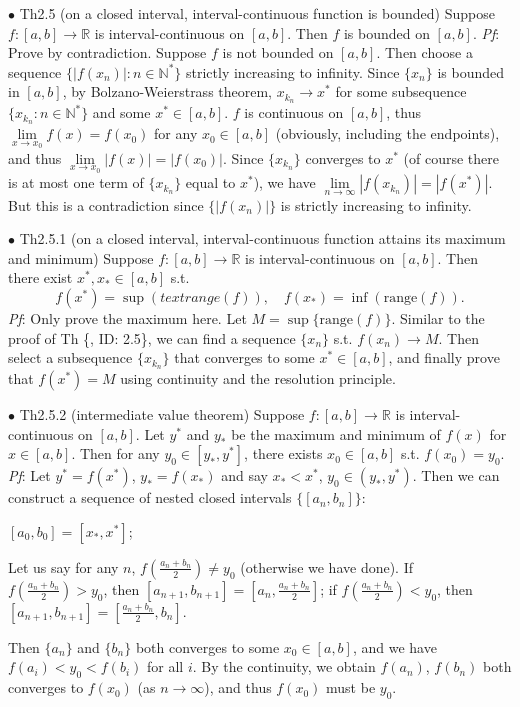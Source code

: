 \documentclass{article}
\begin{document}
\begin{Th}{$\bullet$ Th2.5 (on a closed interval, interval-continuous function is bounded)}
    Suppose $f:[a,b]\rightarrow\mathbb{R}$ is interval-continuous on $[a,b]$. Then $f$ is bounded on $[a,b]$.
    \tcblower
    \textit{Pf}: Prove by contradiction. Suppose $f$ is not bounded on $[a,b]$. Then choose a sequence $\{|f(x_n)|: n\in\mathbb{N}^*\}$ strictly increasing to infinity. Since $\{x_n\}$ is bounded in $[a,b]$, by Bolzano-Weierstrass theorem, $x_{k_n}\rightarrow x^*$ for some subsequence $\{x_{k_n}: n\in\mathbb{N}^*\}$ and some $x^*\in [a,b]$. $f$ is continuous on $[a,b]$, thus $\lim\limits_{x\to x_0}f(x) = f(x_0)$ for any $x_0\in[a,b]$ (obviously, including the endpoints), and thus $\lim\limits_{x\to x_0}|f(x)| = |f(x_0)|$. Since $\{x_{k_n}\}$ converges to $x^*$ (of course there is at most one term of $\{x_{k_n}\}$ equal to $x^*$), we have $\lim\limits_{n\to\infty}|f(x_{k_n})| = |f(x^*)|$. But this is a contradiction since $\{|f(x_n)|\}$ is strictly increasing to infinity.
\end{Th}

\begin{Th}{$\bullet$ Th2.5.1 (on a closed interval, interval-continuous function attains its maximum and minimum)}
    Suppose $f:[a,b]\rightarrow\mathbb{R}$ is interval-continuous on $[a,b]$. Then there exist $x^*, x_*\in [a,b]$ s.t. 
    $$f(x^*) = \sup(text{range}(f)), \quad f(x_*) = \inf(\text{range}(f)).$$
    \tcblower
    \textit{Pf}: Only prove the maximum here. Let $M = \sup\{\text{range}(f)\}$. Similar to the proof of Th \{, ID: 2.5\}, we can find a sequence $\{x_n\}$ s.t. $f(x_n)\rightarrow M$. Then select a subsequence $\{x_{k_n}\}$ that converges to some $x^*\in[a,b]$, and finally prove that $f(x^*) = M$ using continuity and the resolution principle.
\end{Th}

\begin{Th}{$\bullet$ Th2.5.2 (intermediate value theorem)}
    Suppose $f:[a,b]\rightarrow\mathbb{R}$ is interval-continuous on $[a,b]$. Let $y^*$ and $y_*$ be the maximum and minimum of $f(x)$ for $x\in [a,b]$. Then for any $y_0\in [y_*, y^*]$, there exists $x_0\in [a,b]$ s.t. $f(x_0) = y_0$.
    \tcblower
    \textit{Pf}: Let $y^* = f(x^*)$, $y_* = f(x_*)$ and say $x_*<x^*$, $y_0\in(y_*, y^*)$. Then we can construct a sequence of nested closed intervals $\{[a_n, b_n]\}$:
    \begin{compactitem}
        \item $[a_0, b_0] = [x_*, x^*]$;
        \item Let us say for any $n$, $f(\frac{a_n+b_n}{2})\neq y_0 $ (otherwise we have done). If $f(\frac{a_n+b_n}{2})> y_0$, then $[a_{n+1}, b_{n+1}] = [a_n, \frac{a_n+b_n}{2}]$; if $f(\frac{a_n+b_n}{2})< y_0$, then $[a_{n+1}, b_{n+1}] = [\frac{a_n+b_n}{2}, b_n]$.
    \end{compactitem}
    Then $\{a_n\}$ and $\{b_n\}$ both converges to some $x_0\in [a,b]$, and we have $f(a_i)<y_0<f(b_i)$ for all $i$. By the continuity, we obtain $f(a_n)$, $f(b_n)$ both converges to $f(x_0)$ (as $n\rightarrow\infty$), and thus $f(x_0)$ must be $y_0$.
\end{Th}
\end{document}
